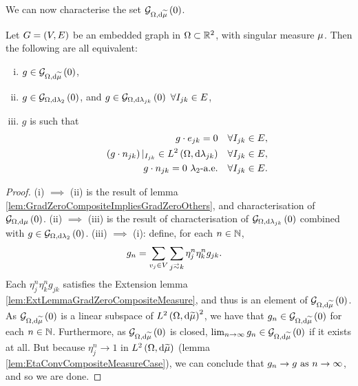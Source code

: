 \documentclass[11pt]{report}
\begin{document}
We can now characterise the set $\mathcal{G}_{ \Omega, \mathrm{d}\widetilde{\mu}}\left( 0 \right)$.
\begin{theorem} \label{thm:CharGradZeroGraphCompositeMeasure}
	Let $G=\left( V,E \right)$ be an embedded graph in $\Omega\subset\mathbb{R}^2$, with singular measure $\mu$.
	Then the following are all equivalent:
	\begin{enumerate}[(i)]
		\item $g\in\mathcal{G}_{ \Omega, \mathrm{d}\widetilde{\mu}}\left( 0 \right)$,
		\item $g\in\mathcal{G}_{ \Omega, \mathrm{d}\lambda_2}\left( 0 \right)$, and $g\in\mathcal{G}_{ \Omega, \mathrm{d}\lambda_{jk}}\left( 0 \right) \ \forall I_{jk}\in E$,
		\item $g$ is such that
		\begin{align*}
			g\cdot e_{jk} = 0 &\quad \forall I_{jk}\in E, \\
			\left( g\cdot n_{jk} \right)\vert_{I_{jk}} \in L^{2}\left( \Omega,\mathrm{d}\lambda_{jk} \right) &\quad \forall I_{jk}\in E, \\
			g\cdot n_{jk} = 0 \ \lambda_2\text{-a.e.} &\quad \forall I_{jk}\in E.
		\end{align*}
	\end{enumerate}
\end{theorem}
\begin{proof}
	(i) $\implies$ (ii) is the result of lemma \ref{lem:GradZeroCompositeImpliesGradZeroOthers}, and characterisation of $\mathcal{G}_{ \Omega, \mathrm{d}\mu}\left( 0 \right)$. \newline
	(ii) $\implies$ (iii) is the result of characterisation of $\mathcal{G}_{ \Omega, \mathrm{d}\lambda_{jk}}\left( 0 \right)$ combined with $g\in\mathcal{G}_{ \Omega, \mathrm{d}\lambda_2}\left( 0 \right)$. \newline
	(iii) $\implies$ (i): define, for each $n\in\mathbb{N}$,
	\begin{align*}
		g_n &= \sum_{v_j\in V}\sum_{j\conLeft k} \eta^n_j \eta^n_k g_{jk}.
	\end{align*}
	Each $\eta^n_j \eta^n_k g_{jk}$ satisfies the Extension lemma \ref{lem:ExtLemmaGradZeroCompositeMeasure}, and thus is an element of $\mathcal{G}_{ \Omega, \mathrm{d}\widetilde{\mu}}\left( 0 \right)$.
	As $\mathcal{G}_{ \Omega, \mathrm{d}\widetilde{\mu}}\left( 0 \right)$ is a linear subspace of $L^{2}\left( \Omega,\mathrm{d}\widetilde{\mu} \right)^2$, we have that $g_n\in\mathcal{G}_{ \Omega, \mathrm{d}\widetilde{\mu}}\left( 0 \right)$ for each $n\in\mathbb{N}$.
	Furthermore, as $\mathcal{G}_{ \Omega, \mathrm{d}\widetilde{\mu}}\left( 0 \right)$ is closed, $\lim_{n\rightarrow\infty}g_n\in\mathcal{G}_{ \Omega, \mathrm{d}\widetilde{\mu}}\left( 0 \right)$ if it exists at all.
	But because $\eta^n_j \rightarrow 1$ in $L^{2}\left( \Omega,\mathrm{d}\widetilde{\mu} \right)$ (lemma \ref{lem:EtaConvCompositeMeasureCase}), we can conclude that $g_n\rightarrow g \ \text{as} \ n \rightarrow\infty$, and so we are done.
\end{proof}
\end{document}
